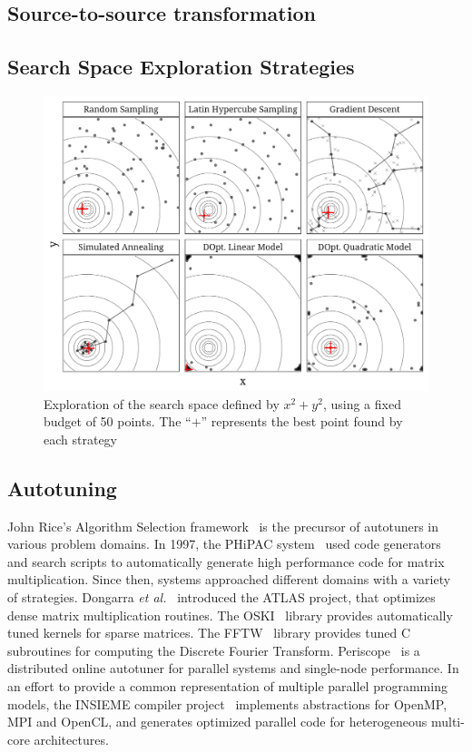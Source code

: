 \documentclass[conference]{IEEEtran}
\begin{document}
\subsection{Source-to-source transformation}
\label{sec:orged868d1}
\subsection{Search Space Exploration Strategies}
\label{sec:orgf8bba88}
\begin{center}
\begin{figure}[htbp]
\centering
\includegraphics[width=.95\columnwidth]{./img/sampling_comparison.pdf}
\caption{\label{fig:org9764b75}
Exploration of the search space defined by \(x^2 + y^2\), using a fixed budget of 50 points. The ``\(+\)'' represents the best point found by each strategy}
\end{figure}
\end{center}
\subsection{Autotuning}
\label{sec:org0ddae62}
John Rice's Algorithm Selection framework~\cite{rice1976algorithm} is the
precursor of autotuners in various problem domains. In 1997, the PHiPAC
system~\cite{bilmes1997optimizing} used code generators and search scripts
to automatically generate high performance code for matrix multiplication. Since
then, systems approached different domains with a variety of strategies.
Dongarra \emph{et al.}~\cite{dongarra1998automatically} introduced the ATLAS
project, that optimizes dense matrix multiplication routines. The
OSKI~\cite{vuduc2005oski} library provides automatically tuned kernels for
sparse matrices. The FFTW~\cite{frigo1998fftw} library provides tuned C
subroutines for computing the Discrete Fourier Transform.
Periscope~\cite{gerndt2010automatic} is a distributed online autotuner for
parallel systems and single-node performance. In an effort to provide a common
representation of multiple parallel programming models, the INSIEME compiler
project~\cite{jordan2012multi} implements abstractions for OpenMP, MPI and
OpenCL, and generates optimized parallel code for heterogeneous multi-core
architectures.
\end{document}
